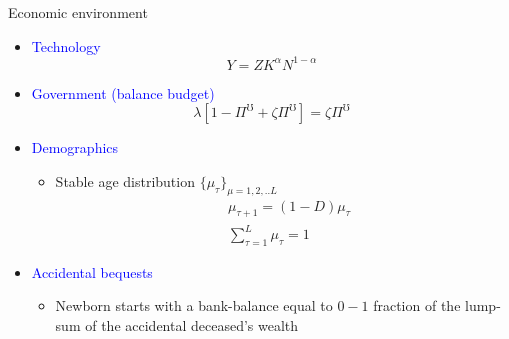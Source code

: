 \documentclass{beamer}
\begin{document}
\begin{frame}{Economic environment}
	\begin{itemize}
		\item \textcolor{blue}{Technology}
		\begin{equation*}
			Y = Z K^{\alpha}N^{1-\alpha}
		\end{equation*}
	\pause
		\item \textcolor{blue}{Government (balance budget)}
	\begin{equation}
		\label{Eq:gov}
		\lambda \left[ 1-\Pi^\mho  + \zeta \Pi^\mho \right]  = \zeta \Pi^\mho   
	\end{equation}
	
	\pause
		\item \textcolor{blue}{Demographics}
		\begin{itemize}
			\item Stable age distribution  $\{\mu_\tau \}_{\mu=1,2,..L}$ 
			\begin{equation*}
				\begin{split}
			& \mu_{\tau+1} = (1-D)\mu_{\tau} \\ &\sum^{L}_{\tau=1}\mu_{\tau} = 1
			\end{split}
			\end{equation*}
		\end{itemize}
	\pause
		\item \textcolor{blue}{Accidental bequests}
		 \begin{itemize}
		 	\item Newborn starts with a bank-balance equal to $0-1$ fraction of the lump-sum of the accidental deceased's wealth 
		 \end{itemize}
	\end{itemize}
\end{frame}
\end{document}
